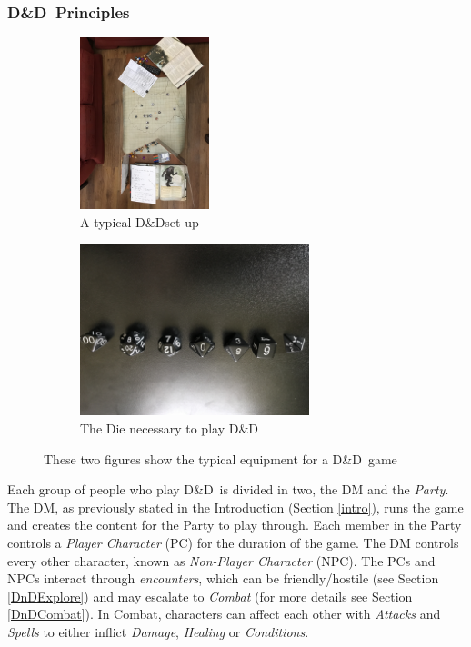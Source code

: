 \documentclass[review]{cmpreport}
\newcommand{\dnd}{D\&D}
\begin{document}
	\subsubsection{\dnd \ Principles} \label{DnDPrinciples}
	\begin{figure}[h] \label{DnDEquipmentExample}
		\begin{subfigure}{0.5\textwidth}
			\includegraphics[width=0.9\linewidth, height=5cm, angle=180]{DnD_Live.jpg}
			\caption{A typical \dnd set up} \label{DnDLive}
		\end{subfigure}
		\begin{subfigure}{0.5\textwidth}
			\includegraphics[width=0.9\linewidth, height=5cm, angle=180]{DnD_Dice.jpg}
			\caption{The Die necessary to play \dnd} \label{DnDDice}
		\end{subfigure}
		\caption{These two figures show the typical equipment for a \dnd \ game}
	\end{figure}

	Each group of people who play \dnd \ is divided in two, the DM and the \emph{Party}. The DM, as previously stated in the Introduction (Section \ref{intro}), runs the game and creates the content for the Party to play through. Each member in the Party controls a \emph{Player Character} (PC) for the duration of the game. The DM controls every other character, known as \emph{Non-Player Character} (NPC). The PCs and NPCs interact through \emph{encounters}, which can be friendly/hostile (see Section \ref{DnDExplore}) and may escalate to \emph{Combat} (for more details see Section \ref{DnDCombat}). In Combat, characters can affect each other with \emph{Attacks} and \emph{Spells} to either inflict \emph{Damage}, \emph{Healing} or \emph{Conditions}.
	
\end{document}
